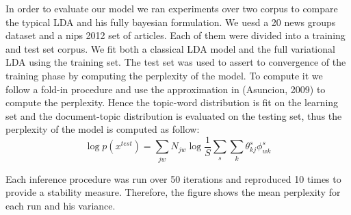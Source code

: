 
In order to evaluate our model we ran experiments over two corpus to compare the typical LDA and his fully bayesian formulation. We uesd a 20 news groups dataset and a nips 2012 set of articles. Each of them were divided into a training and test set corpus. We fit both a classical LDA model and the full variational LDA using the training set. The test set was used to assert to convergence of the training phase by computing the perplexity of the model. To compute it we follow a fold-in procedure and  use the approximation in (Asuncion, 2009) to compute the perplexity. Hence the topic-word distribution is fit on the learning set and the document-topic distribution is evaluated on the testing set, thus the perplexity of the model is computed as follow: 
\[ \log p(x^{test}) = \sum_{jw} N_{jw} \log \frac{1}{S} \sum_s \sum_k \theta^s_{kj} \phi^s_{wk} \]

Each inference procedure was run over 50 iterations and reproduced 10 times to provide a stability measure. Therefore, the figure shows the mean perplexity for each run and his variance.
